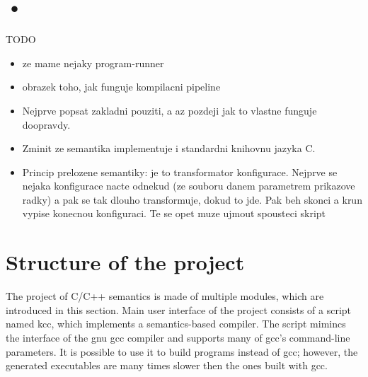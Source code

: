 \documentclass{fithesis3}
\begin{document}



\section{•}

TODO
\begin{itemize}
\item ze mame nejaky program-runner
\item obrazek toho, jak funguje kompilacni pipeline
\item Nejprve popsat zakladni pouziti, a az pozdeji jak to vlastne funguje doopravdy.
\item Zminit ze semantika implementuje i standardni knihovnu jazyka C.
\item Princip prelozene semantiky: je to transformator konfigurace. Nejprve se nejaka konfigurace nacte odnekud (ze souboru danem parametrem prikazove radky) a pak se tak dlouho transformuje, dokud to jde. Pak beh skonci a krun vypise konecnou konfiguraci. Te se opet muze ujmout spousteci skript 
\end{itemize}

\section{Structure of the project}



The project of C/C++ semantics is made of multiple modules, which are introduced in this section. 
Main user interface of the project consists of a script named kcc, which implements a semantics-based compiler. The script mimincs the interface of the gnu gcc compiler and supports many of gcc's command-line parameters. It is possible to use it to build programs instead of gcc; however, the generated executables are many times slower then the ones built with gcc.
\end{document}
